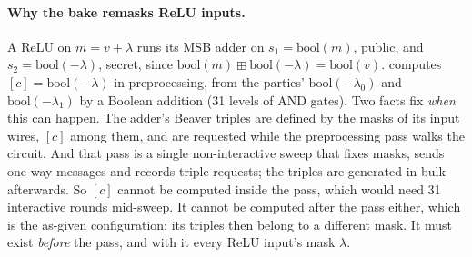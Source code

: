 \paragraph{Why the bake remasks ReLU inputs.} A ReLU on $m = v + \lambda$ runs its MSB adder on $s_1 = \mathrm{bool}(m)$,
public, and $s_2 = \mathrm{bool}(-\lambda)$, secret, since $\mathrm{bool}(m) \boxplus \mathrm{bool}(-\lambda) =
\mathrm{bool}(v)$.  computes $[c] = \mathrm{bool}(-\lambda)$ in preprocessing, from the parties'
$\mathrm{bool}(-\lambda_0)$ and $\mathrm{bool}(-\lambda_1)$ by a Boolean addition (31 levels of AND gates). Two facts fix
\emph{when} this can happen. The adder's Beaver triples are defined by the masks of its input wires, $[c]$ among them,
and are requested while the preprocessing pass walks the circuit. And that pass is a single non-interactive sweep that
fixes masks, sends one-way messages and records triple requests; the triples are generated in bulk afterwards. So $[c]$
cannot be computed inside the pass, which would need 31 interactive rounds mid-sweep. It cannot be computed after the
pass either, which is the as-given configuration: its triples then belong to a different mask. It must exist
\emph{before} the pass, and with it every ReLU input's mask $\lambda$.

